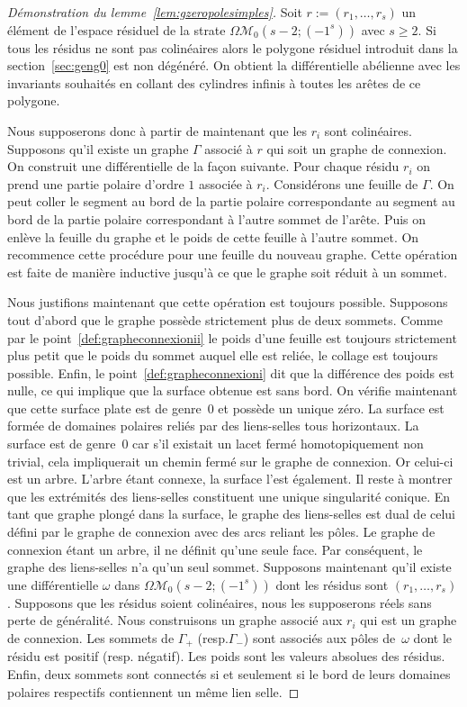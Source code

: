 \documentclass[11pt]{article}
\newcommand{\resp}{resp.\xspace}
\numberwithin{equation}{section}\renewcommand{\proofname}{Démonstration}
\let\mathcal\mathscr
\newcommand{\omoduli}[1][g]{{\Omega\mathcal M}_{\!#1}}
\theoremstyle{definition}
\begin{document}
\begin{proof}[Démonstration du lemme~\ref{lem:gzeropolesimples}]
Soit $r:=(r_{1},\dots,r_{s})$ un élément de l'espace résiduel de la strate $\omoduli[0](s-2;(-1^{s}))$ avec $s\geq2$. Si tous les résidus ne sont pas colinéaires alors le polygone résiduel introduit dans la section~\ref{sec:geng0} est non dégénéré. On obtient la différentielle abélienne avec les invariants souhaités en collant des cylindres infinis à toutes les arêtes de ce polygone.

Nous supposerons donc à partir de maintenant que les $r_{i}$ sont colinéaires. Supposons qu'il existe un graphe $\Gamma$ associé à $r$ qui soit un graphe de connexion. On construit une différentielle de la façon suivante. Pour chaque résidu $r_{i}$ on prend une partie polaire d'ordre $1$ associée à $r_{i}$. Considérons une feuille de $\Gamma$. On peut coller le segment au bord de la partie polaire correspondante au segment au bord de la partie polaire correspondant à l'autre sommet de l'arête. Puis on enlève la feuille du graphe et le poids de cette feuille à l'autre sommet. On recommence cette procédure pour une feuille du nouveau graphe. Cette opération est faite de manière inductive jusqu'à ce que le graphe soit réduit à un sommet.

Nous justifions maintenant que cette opération est toujours possible. Supposons tout d'abord que le graphe possède strictement plus de deux sommets. Comme par le point~\eqref{def:grapheconnexionii} le poids d'une feuille est toujours strictement plus petit que le poids du sommet auquel elle est reliée, le collage est toujours possible. Enfin, le point~\eqref{def:grapheconnexioni} dit que la différence des poids est nulle, ce qui implique que la surface obtenue est sans bord. On vérifie maintenant que cette surface plate est de genre~$0$ et possède un unique zéro. La surface est formée de domaines polaires reliés par des liens-selles tous horizontaux. La surface est de genre~$0$ car s'il existait un lacet fermé homotopiquement non trivial, cela impliquerait un chemin fermé sur le graphe de connexion. Or celui-ci est un arbre. L'arbre étant connexe, la surface l'est également. Il reste à montrer que les extrémités des liens-selles constituent une unique singularité conique. En tant que graphe plongé dans la surface, le graphe des liens-selles est dual de celui défini par le graphe de connexion avec des arcs reliant les pôles. Le graphe de connexion étant un arbre, il ne définit qu'une seule face. Par conséquent, le graphe des liens-selles n'a qu'un seul sommet.
Supposons maintenant qu'il existe une différentielle $\omega$ dans $\omoduli[0](s-2;(-1^{s}))$ dont les résidus sont $(r_{1},\dots,r_{s})$. Supposons que les résidus soient colinéaires, nous les supposerons réels sans perte de généralité. Nous construisons un graphe associé aux $r_{i}$ qui est un graphe de connexion. Les sommets de $\Gamma_{+}$ (\resp $\Gamma_{-}$) sont associés aux pôles de~$\omega$ dont le résidu est positif (\resp négatif). Les poids sont les valeurs absolues des résidus. Enfin, deux sommets sont connectés si et seulement si le bord de leurs domaines polaires respectifs contiennent un même lien selle.


\end{proof}
\end{document}
